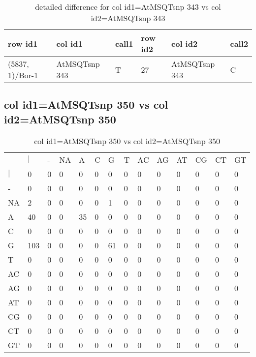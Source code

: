 \begin{center}
\begin{longtable}{|l|l|l|l|l|l|}
\caption{detailed difference for col id1=AtMSQTsnp 343 vs col id2=AtMSQTsnp 343} \label{table_dm669}\\
\hline
row id1&col id1&call1&row id2&col id2&call2\\
\hline
(5837, 1)/Bor-1&AtMSQTsnp 343&T&27&AtMSQTsnp 343&C\\
\hline
\end{longtable}
\end{center}

\subsection{col id1=AtMSQTsnp 350 vs col id2=AtMSQTsnp 350}
\begin{center}
\begin{longtable}{|l|l|l|l|l|l|l|l|l|l|l|l|l|l|}
\caption{col id1=AtMSQTsnp 350 vs col id2=AtMSQTsnp 350} \label{table_dm670}\\
\hline
\\
\hline
&$|$&-&NA&A&C&G&T&AC&AG&AT&CG&CT&GT\\
$|$&0&0&0&0&0&0&0&0&0&0&0&0&0\\
-&0&0&0&0&0&0&0&0&0&0&0&0&0\\
NA&2&0&0&0&0&1&0&0&0&0&0&0&0\\
A&40&0&0&35&0&0&0&0&0&0&0&0&0\\
C&0&0&0&0&0&0&0&0&0&0&0&0&0\\
G&103&0&0&0&0&61&0&0&0&0&0&0&0\\
T&0&0&0&0&0&0&0&0&0&0&0&0&0\\
AC&0&0&0&0&0&0&0&0&0&0&0&0&0\\
AG&0&0&0&0&0&0&0&0&0&0&0&0&0\\
AT&0&0&0&0&0&0&0&0&0&0&0&0&0\\
CG&0&0&0&0&0&0&0&0&0&0&0&0&0\\
CT&0&0&0&0&0&0&0&0&0&0&0&0&0\\
GT&0&0&0&0&0&0&0&0&0&0&0&0&0\\
\hline
\end{longtable}
\end{center}

